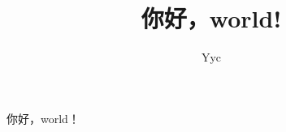 \documentclass[UTF8]{ctexart}
\title{你好，world!}
\author{Yyc}
\begin{document}
\maketitle
你好，world！
\end{document}

